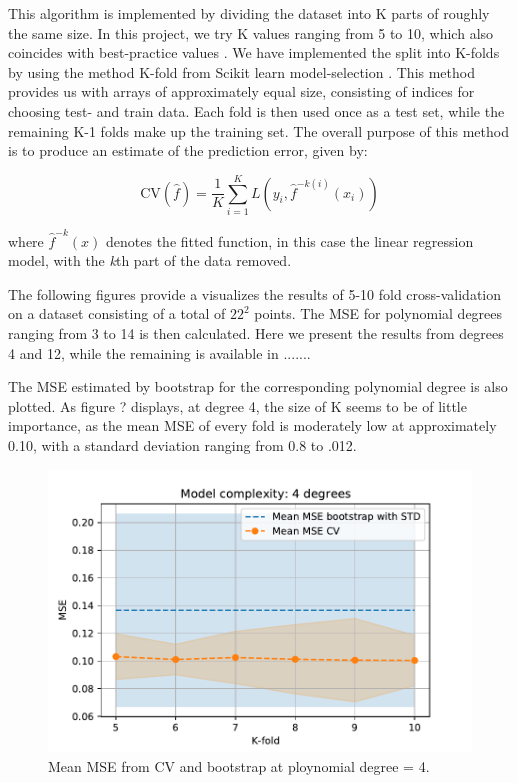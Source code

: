 \documentclass[11pt, a4paper]{article}
\begin{document}
This algorithm is implemented by dividing the dataset into K parts of roughly the same size. In this project, we try K values ranging from 5 to 10, which also coincides with best-practice values \cite{Hastie2009}.  We have implemented the split into K-folds by using the method K-fold from Scikit learn model-selection \cite{link_to_doc}. This method provides us with arrays of approximately equal size, consisting of indices for choosing test- and train data.  Each fold is then used once as a test set, while the remaining K-1 folds make up the training set. The overall purpose of this method is to produce an estimate of the prediction error, given by:

\[
  \text{CV}(\hat{f}) = \frac{1}{K}
  \sum_{i=1}^{K}L(y_i,\hat{f}^{-k(i)}(x_i))
\]

where $\hat{f}^{-k}(x)$ denotes the fitted function, in this case the linear regression model, with the \emph{k}th part of the data removed.\cite{Hastie2009}

The following figures provide a visualizes the results of 5-10 fold cross-validation on a dataset consisting of a total of $22^2$ points\cite{notebook_exc3}. The MSE for polynomial degrees ranging from 3 to 14 is then calculated. Here we present the results from degrees 4 and 12, while the remaining is available in {.......}

 
The MSE estimated by bootstrap for the corresponding polynomial degree is also plotted. As figure ? displays,  at degree 4, the size of K seems to be of little importance, as the mean MSE of every fold is moderately low at approximately 0.10, with a standard deviation ranging from 0.8 to .012.  

\begin{figure}[h]
  \centering
  \includegraphics[scale=0.75]{figures/EX3_mse_cv_boot4.pdf}
  \caption{\label{fig:?} Mean MSE from CV and bootstrap at ploynomial degree = 4.}
\end{figure}
\end{document}
